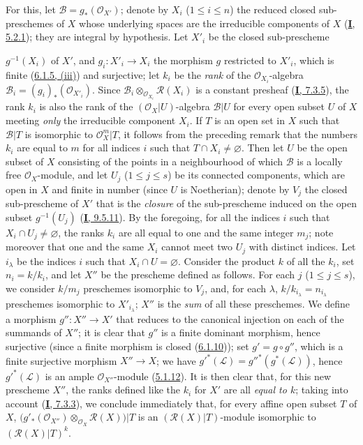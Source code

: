 For this, let $\mathcal{B}=g_*(\mathcal{O}_{X'})$; denote by $X_i$
($1\leq i\leq n$) the reduced closed sub-preschemes of $X$ whose
underlying spaces are the irreducible components of $X$
(\hyperref[I.5.2.1]{\textbf{I}, 5.2.1}); they are integral by hypothesis. Let
$X'_i$ be the closed sub-prescheme


$g^{-1}(X_i)$ of $X'$, and $g_i:X'_i\to X_i$ the morphism $g$ restricted to
$X'_i$, which is finite (\hyperref[II.6.1.5]{6.1.5, (iii)}) and surjective;
let $k_i$ be the \emph{rank} of the $\mathcal{O}_{X_i}$-algebra
$\mathcal{B}_i=(g_i)_*(\mathcal{O}_{X'_i})$. Since
$\mathcal{B}_i\otimes_{\mathcal{O}_{X_i}}\mathcal{R}(X_i)$ is a
constant presheaf (\hyperref[I.7.3.5]{\textbf{I}, 7.3.5}), the rank $k_i$ is
also the rank of the $(\mathcal{O}_X|U)$-algebra $\mathcal{B}|U$ for every
open subset $U$ of $X$ meeting \emph{only} the irreducible component
$X_i$. If $T$ is an open set in $X$ such that $\mathcal{B}|T$ is
isomorphic to $\mathcal{O}_X^m|T$, it follows from the preceding remark that
the numbers $k_i$ are equal to $m$ for all indices $i$ such that
$T\cap X_i\neq\varnothing$. Then let $U$ be the open subset of $X$ consisting of
the points in a neighbourhood of which $\mathcal{B}$ is a locally free
$\mathcal{O}_X$-module, and let $U_j$ ($1\leq j\leq s$) be its connected
components, which are open in $X$ and finite in number (since $U$ is
Noetherian); denote by $V_j$ the closed sub-prescheme of $X'$ that is the
\emph{closure} of the sub-prescheme induced on the open subset $g^{-1}(U_j)$
(\hyperref[I.9.5.11]{\textbf{I}, 9.5.11}). By the foregoing, for all the
indices $i$ such that $X_i\cap U_j\neq\varnothing$, the ranks $k_i$ are all
equal to one and the same integer $m_j$; note moreover that one and the same
$X_i$ cannot meet two $U_j$ with distinct indices. Let $i_\lambda$ be the
indices $i$ such that $X_i\cap U=\varnothing$. Consider the product $k$ of all the
$k_i$, set $n_i=k/k_i$, and let $X''$ be the prescheme defined as follows.
For each $j$ ($1\leq j\leq s$), we consider $k/m_j$ preschemes
isomorphic to $V_j$, and, for each $\lambda$, $k/k_{i_\lambda}=n_{i_\lambda}$ preschemes
isomorphic to $X'_{i_\lambda}$; $X''$ is the \emph{sum} of all these
preschemes. We define a morphism $g'':X''\to X'$ that reduces to the
canonical injection on each of the summands of $X''$; it is clear that
$g''$ is a finite dominant morphism, hence surjective (since a finite
morphism is closed (\hyperref[II.6.1.10]{6.1.10})); set
$g'=g\circ g''$, which is a finite surjective morphism $X''\to X$; we have
${g'}^*(\mathcal{L})={g''}^*(g^*(\mathcal{L}))$, hence
${g'}^*(\mathcal{L})$ is an ample $\mathcal{O}_{X''}$-module
(\hyperref[II.5.1.12]{5.1.12}). It is then clear that, for this new
prescheme $X''$, the ranks defined like the $k_i$ for $X'$ are all
\emph{equal to $k$}; taking into account
(\hyperref[I.7.3.3]{\textbf{I}, 7.3.3}), we conclude immediately that, for every
affine open subset $T$ of $X$, $\bigl(g'_*(\mathcal{O}_{X''})
\otimes_{\mathcal{O}_X}\mathcal{R}(X)\bigr)|T$
is an $(\mathcal{R}(X)|T)$-module isomorphic to
$(\mathcal{R}(X)|T)^k$.


